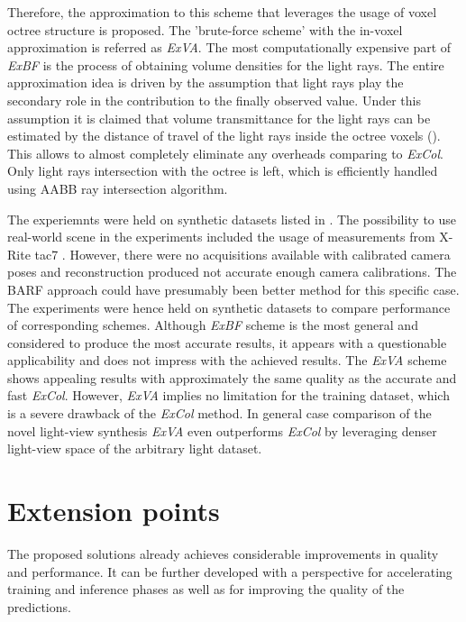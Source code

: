 Therefore, the approximation to this scheme that leverages the usage of voxel octree structure is proposed.
The 'brute-force scheme' with the in-voxel approximation is referred as \textit{ExVA}.
The most computationally expensive part of \textit{ExBF} is the process of
obtaining volume densities for the light rays.
The entire approximation idea is driven by the assumption
that light rays play the secondary role in the contribution to the finally observed value.
Under this assumption it is claimed that volume transmittance for the light rays
can be estimated by the distance of travel of the light rays inside the octree voxels ().
This allows to almost completely eliminate any overheads comparing to \textit{ExCol}.
Only light rays intersection with the octree is left,
which is efficiently handled using AABB ray intersection algorithm.

The experiemnts were held on synthetic datasets listed in .
The possibility to use real-world scene in the experiments included the usage of measurements from X-Rite tac7 \cite{merzbach2017highquality}.
However, there were no acquisitions available with calibrated camera poses
and reconstruction produced not accurate enough camera calibrations.
The BARF approach \cite{lin2021barf} could have presumably been better method for this specific case.
The experiments were hence held on synthetic datasets to compare performance of corresponding schemes.
Although \textit{ExBF} scheme is the most general and considered to produce the most accurate results,
it appears with a questionable applicability and does not impress with the achieved results.
The \textit{ExVA} scheme shows appealing results with approximately the same quality as the accurate and fast \textit{ExCol}.
However, \textit{ExVA} implies no limitation for the training dataset,
which is a severe drawback of the \textit{ExCol} method.
In general case comparison of the novel light-view synthesis \textit{ExVA} 
even outperforms \textit{ExCol} by leveraging denser light-view space of the arbitrary light dataset.





\section{Extension points}

The proposed solutions already achieves considerable improvements in quality and performance.
It can be further developed with a perspective for accelerating training and inference phases
as well as for improving the quality of the predictions.

